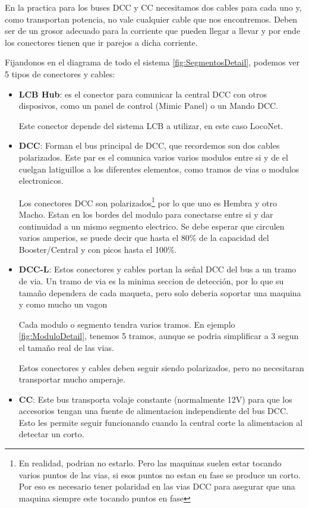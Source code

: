 En la practica para los buses DCC y CC necesitamos dos cables para cada uno y, como transportan potencia, no vale cualquier cable que nos encontremos. Deben ser de un grosor adecuado para la corriente que pueden llegar a llevar y por ende los conectores tienen que ir parejos a dicha corriente. 

Fijandonos en el diagrama de todo el sistema \ref{fig:SegmentosDetail}, podemos ver 5 tipos de conectores y cables:
\begin{itemize}
	\item \textbf{LCB Hub}: es el conector para comunicar la central DCC con otros disposivos, como un panel de control (Mimic Panel) o un Mando DCC.

	Este conector depende del sistema LCB a utilizar, en este caso LocoNet.
	\item \textbf{DCC}: Forman el bus principal de DCC, que recordemos son dos cables polarizados. Este par es el comunica varios varios modulos entre si y de el cuelgan latiguillos a los diferentes elementos, como tramos de vias o modulos electronicos.

Los conectores DCC son polarizados\footnote{En realidad, podrian no estarlo. Pero las maquinas suelen estar tocando varios puntos de las vias, si esos puntos no estan en fase se produce un corto. Por eso es necesario tener polaridad en las vias DCC para asegurar que una maquina siempre este tocando puntos en fase} por lo que uno es Hembra y otro Macho. Estan en los bordes del modulo para conectarse entre si y dar continuidad a un mismo segmento electrico. Se debe esperar que circulen varios amperios, se puede decir que hasta el 80\% de la capacidad del Booster/Central y con picos hasta el 100\%.
\item \textbf{DCC-L}: Estos conectores y cables portan la señal DCC del bus a un tramo de via. Un tramo de via es la minima seccion de detección, por lo que su tamaño dependera de cada maqueta, pero solo deberia soportar una maquina y como mucho un vagon

Cada modulo o segmento tendra varios tramos. En ejemplo \ref{fig:ModuloDetail}, tenemos 5 tramos, aunque se podria simplificar a 3 segun el tamaño real de las vias.

Estos conectores y cables deben seguir siendo polarizados, pero no necesitaran transportar mucho amperaje.

\item \textbf{CC}: Este bus transporta volaje constante (normalmente 12V) para que los accesorios tengan una fuente de alimentacion independiente del bus DCC. Esto les permite seguir funcionando cuando la central corte la alimentacion al detectar un corto.


\end{itemize}

